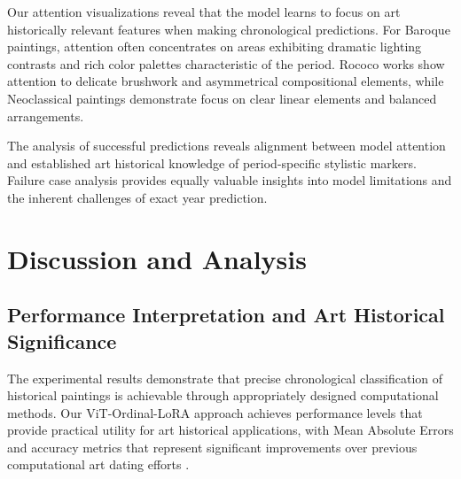 \documentclass[10pt,twocolumn,letterpaper]{article}
\begin{document}

Our attention visualizations reveal that the model learns to focus on art historically relevant features when making chronological predictions. For Baroque paintings, attention often concentrates on areas exhibiting dramatic lighting contrasts and rich color palettes characteristic of the period. Rococo works show attention to delicate brushwork and asymmetrical compositional elements, while Neoclassical paintings demonstrate focus on clear linear elements and balanced arrangements.

The analysis of successful predictions reveals alignment between model attention and established art historical knowledge of period-specific stylistic markers. Failure case analysis provides equally valuable insights into model limitations and the inherent challenges of exact year prediction.

\section{Discussion and Analysis}

\subsection{Performance Interpretation and Art Historical Significance}

The experimental results demonstrate that precise chronological classification of historical paintings is achievable through appropriately designed computational methods. Our ViT-Ordinal-LoRA approach achieves performance levels that provide practical utility for art historical applications, with Mean Absolute Errors and accuracy metrics that represent significant improvements over previous computational art dating efforts \cite{Mensink14, Strezoski18}.
\end{document}
